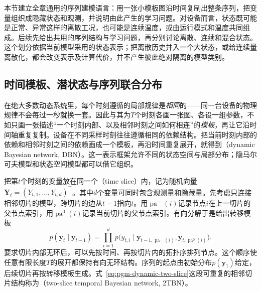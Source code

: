 本节建立全章通用的序列建模语言：用一张小模板图沿时间复制出整条序列，把变量组织成隐藏状态和观测，并说明由此产生的学习问题。对设备而言，状态既可能是正常、异常这样的离散工况，也可能是连续温度，或由运行模式和温度共同组成。后续先给出共用的序列结构与学习问题，再分别讨论离散、连续和混合状态。这个划分依据当前模型采用的状态表示；把离散历史并入一个大状态，或给连续量离散化，都会改变表示及计算代价，并不产生彼此绝对隔离的模型类别。

\subsection{时间模板、潜状态与序列联合分布}
\label{sec:pgm-dynamic-template}

在绝大多数动态系统里，每个时刻遵循的局部规律是\emph{相同}的——同一台设备的物理规律不会每过一秒就换一套。因此与其为$T$个时刻各画一张图、各设一组参数，不如只画一张描述“一个时刻内部、以及相邻时刻之间如何相连”的\emph{模板}，再让它沿时间轴重复复制。设备在不同采样时刻往往遵循相同的依赖结构。把当前时刻内部的依赖和相邻时刻之间的依赖画成一个模板，再沿时间重复展开，就得到（dynamic Bayesian network, DBN）。这一表示框架允许不同的状态空间与局部分布；隐马尔可夫模型和状态空间模型都可以借它组织。

把第$t$个时刻的变量放在同一个（time slice）内，记为随机向量$\bm{Y}_t=(Y_{t,1},\ldots,Y_{t,d})^\top$。其中$d$个变量可同时包含观测量和隐藏量。先考虑只连接相邻切片的模型，跨切片的边从$t-1$指向$t$。用$\operatorname{pa}^{-}(i)$记录节点$i$在上一切片的父节点索引，用$\operatorname{pa}^{0}(i)$记录当前切片的父节点索引。有向分解于是给出转移模板
\begin{equation}
  p(\bm{y}_t\mid\bm{y}_{t-1})
  =\prod_{i=1}^{d}
    p\bigl(y_{t,i}\mid
      \bm{y}_{t-1,\operatorname{pa}^{-}(i)},
      \bm{y}_{t,\operatorname{pa}^{0}(i)}\bigr).
  \label{eq:pgm-dynamic-two-slice}
\end{equation}
要求切片内部无环后，可以先按时间、再按切片内的拓扑序排列节点。这个顺序使任意有限长度$T$的展开都保持有向无环结构。序列的起点由初始分布$p(\bm{y}_1)$给定，后续切片再按转移模板生成。式~\eqref{eq:pgm-dynamic-two-slice}这段可重复的相邻切片结构称为（two-slice temporal Bayesian network, 2TBN）。

